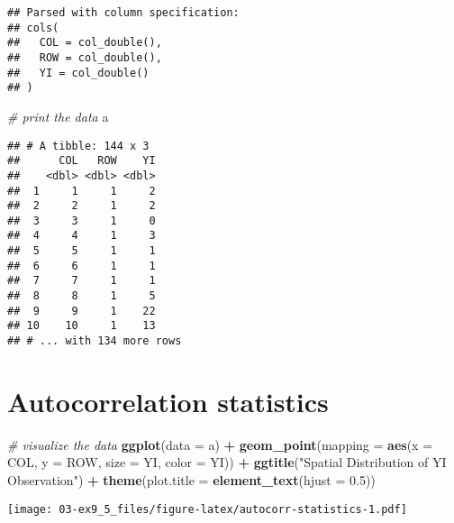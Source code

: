 \documentclass[]{book}
\newenvironment{Shaded}{\begin{snugshade}}{\end{snugshade}}
\newcommand{\CommentTok}[1]{\textcolor[rgb]{0.56,0.35,0.01}{\textit{#1}}}
\newcommand{\DataTypeTok}[1]{\textcolor[rgb]{0.13,0.29,0.53}{#1}}
\newcommand{\FloatTok}[1]{\textcolor[rgb]{0.00,0.00,0.81}{#1}}
\newcommand{\KeywordTok}[1]{\textcolor[rgb]{0.13,0.29,0.53}{\textbf{#1}}}
\newcommand{\NormalTok}[1]{#1}
\newcommand{\OperatorTok}[1]{\textcolor[rgb]{0.81,0.36,0.00}{\textbf{#1}}}
\newcommand{\StringTok}[1]{\textcolor[rgb]{0.31,0.60,0.02}{#1}}
\begin{document}
\begin{verbatim}
## Parsed with column specification:
## cols(
##   COL = col_double(),
##   ROW = col_double(),
##   YI = col_double()
## )
\end{verbatim}

\begin{Shaded}
\begin{Highlighting}[]
\CommentTok{# print the data}
\NormalTok{a}
\end{Highlighting}
\end{Shaded}

\begin{verbatim}
## # A tibble: 144 x 3
##      COL   ROW    YI
##    <dbl> <dbl> <dbl>
##  1     1     1     2
##  2     2     1     2
##  3     3     1     0
##  4     4     1     3
##  5     5     1     1
##  6     6     1     1
##  7     7     1     1
##  8     8     1     5
##  9     9     1    22
## 10    10     1    13
## # ... with 134 more rows
\end{verbatim}

\hypertarget{autocorrelation-statistics-1}{%
\section{Autocorrelation statistics}\label{autocorrelation-statistics-1}}

\begin{Shaded}
\begin{Highlighting}[]
\CommentTok{# visualize the data}
\KeywordTok{ggplot}\NormalTok{(}\DataTypeTok{data =}\NormalTok{ a) }\OperatorTok{+}
\StringTok{  }\KeywordTok{geom_point}\NormalTok{(}\DataTypeTok{mapping =} \KeywordTok{aes}\NormalTok{(}\DataTypeTok{x =}\NormalTok{ COL, }\DataTypeTok{y =}\NormalTok{ ROW, }\DataTypeTok{size =}\NormalTok{ YI, }\DataTypeTok{color =}\NormalTok{ YI)) }\OperatorTok{+}
\StringTok{  }\KeywordTok{ggtitle}\NormalTok{(}\StringTok{"Spatial Distribution of YI Observation"}\NormalTok{) }\OperatorTok{+}
\StringTok{  }\KeywordTok{theme}\NormalTok{(}\DataTypeTok{plot.title =} \KeywordTok{element_text}\NormalTok{(}\DataTypeTok{hjust =} \FloatTok{0.5}\NormalTok{))}
\end{Highlighting}
\end{Shaded}

\texttt{[image: 03-ex9\_5\_files/figure-latex/autocorr-statistics-1.pdf]}
\end{document}
